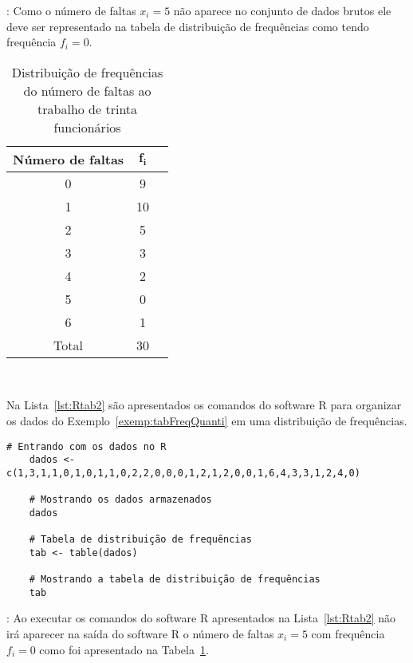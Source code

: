 \documentclass[11pt,fleqn]{book} %
\begin{document}
\begin{example}
	: Como o número de faltas $x_i=5$ não aparece no conjunto de dados brutos ele deve ser representado na tabela de distribuição de frequências como tendo frequência $f_i=0$.
	
	\begin{table}[h]
	\caption{Distribuição de frequências do número de faltas ao trabalho de trinta funcionários}
	\label{tab:distfreqquant1} 
	\vspace{0.1cm}
	\centering
	\begin{tabular}{c c c}
	\toprule
	\textbf{Número de faltas} & $\bm{f_i}$ & \\
	\midrule
	0 & 9 \\
	1 & 10 \\
	2 & 5 \\
	3 & 3 \\
	4 & 2 \\
	5 & 0 \\
	6 & 1 \\
	\hline
	Total & 30 \\
	\bottomrule
	\end{tabular} \\
	\end{table}
	
\end{example}

\vspace{0.5cm}

Na Lista~\ref{lst:Rtab2} são apresentados os comandos do software R para organizar os dados do Exemplo~\ref{exemp:tabFreqQuanti} em uma distribuição de frequências. \\

\begin{scriptsize}
	\estiloR
	\begin{lstlisting}[caption={Comandos do software R}, label=lst:Rtab2]
	# Entrando com os dados no R
	dados <- c(1,3,1,1,0,1,0,1,1,0,2,2,0,0,0,1,2,1,2,0,0,1,6,4,3,3,1,2,4,0)

	# Mostrando os dados armazenados
	dados

	# Tabela de distribuição de frequências
	tab <- table(dados)

	# Mostrando a tabela de distribuição de frequências
	tab

	\end{lstlisting}
\end{scriptsize}

: Ao executar os comandos do software R apresentados na Lista~\ref{lst:Rtab2} não irá aparecer na saída do software R o número de faltas $x_i=5$ com frequência $f_i=0$ como foi apresentado na Tabela~\ref{tab:distfreqquant1}. \\
\end{document}
